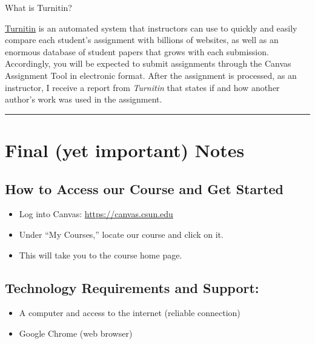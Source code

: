 \documentclass[11pt,]{article}
\providecommand{\tightlist}{%
  \setlength{\itemsep}{0pt}\setlength{\parskip}{0pt}}
\begin{document}
What is Turnitin?

\href{https://www.turnitin.com/}{Turnitin} is an automated system that
instructors can use to quickly and easily compare each student's
assignment with billions of websites, as well as an enormous database of
student papers that grows with each submission. Accordingly, you will be
expected to submit assignments through the Canvas Assignment Tool in
electronic format. After the assignment is processed, as an instructor,
I receive a report from \emph{Turnitin} that states if and how another
author's work was used in the assignment.

\begin{center}\rule{0.5\linewidth}{0.5pt}\end{center}

\hypertarget{final-yet-important-notes}{%
\section{Final (yet important) Notes}\label{final-yet-important-notes}}

\hypertarget{how-to-access-our-course-and-get-started}{%
\subsection{How to Access our Course and Get
Started}\label{how-to-access-our-course-and-get-started}}

\begin{itemize}
\tightlist
\item
  Log into Canvas: \url{https://canvas.csun.edu}
\item
  Under ``My Courses,'' locate our course and click on it.
\item
  This will take you to the course home page.
\end{itemize}

\hypertarget{technology-requirements-and-support}{%
\subsection{Technology Requirements and
Support:}\label{technology-requirements-and-support}}

\begin{itemize}
\tightlist
\item
  A computer and access to the internet (reliable connection)
\item
  Google Chrome (web browser)
\end{itemize}
\end{document}
